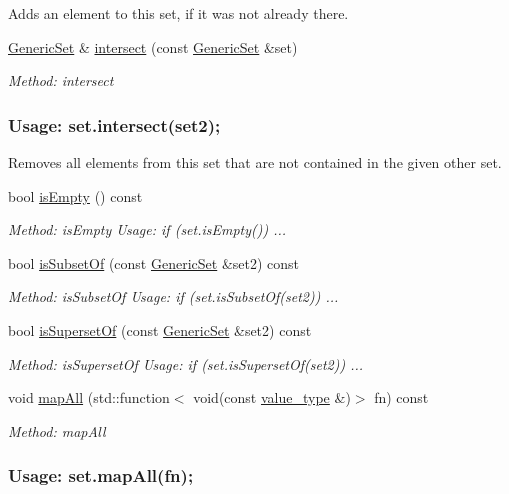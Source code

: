 \begin{DoxyCompactItemize}
\begin{DoxyCompactList}
Adds an element to this set, if it was not already there. \end{DoxyCompactList}\item 
\mbox{\hyperlink{classstanfordcpplib_1_1collections_1_1GenericSet}{Generic\+Set}} \& \mbox{\hyperlink{classstanfordcpplib_1_1collections_1_1GenericSet_a1892695645d8f29cbc6c8587500f2829}{intersect}} (const \mbox{\hyperlink{classstanfordcpplib_1_1collections_1_1GenericSet}{Generic\+Set}} \&set)
\begin{DoxyCompactList}\small\item\em Method\+: intersect \subsubsection*{Usage\+: set.\+intersect(set2); }

Removes all elements from this set that are not contained in the given other set. \end{DoxyCompactList}\item 
bool \mbox{\hyperlink{classstanfordcpplib_1_1collections_1_1GenericSet_acf82f9b2937375c7b1cf3dccb3df3312}{is\+Empty}} () const
\begin{DoxyCompactList}\small\item\em Method\+: is\+Empty Usage\+: if (set.\+is\+Empty()) ... \end{DoxyCompactList}\item 
bool \mbox{\hyperlink{classstanfordcpplib_1_1collections_1_1GenericSet_af8ce41f03d31f89935db1f3f5fdffc2c}{is\+Subset\+Of}} (const \mbox{\hyperlink{classstanfordcpplib_1_1collections_1_1GenericSet}{Generic\+Set}} \&set2) const
\begin{DoxyCompactList}\small\item\em Method\+: is\+Subset\+Of Usage\+: if (set.\+is\+Subset\+Of(set2)) ... \end{DoxyCompactList}\item 
bool \mbox{\hyperlink{classstanfordcpplib_1_1collections_1_1GenericSet_a074ab19fab73dfcff220d4b64aa5be82}{is\+Superset\+Of}} (const \mbox{\hyperlink{classstanfordcpplib_1_1collections_1_1GenericSet}{Generic\+Set}} \&set2) const
\begin{DoxyCompactList}\small\item\em Method\+: is\+Superset\+Of Usage\+: if (set.\+is\+Superset\+Of(set2)) ... \end{DoxyCompactList}\item 
void \mbox{\hyperlink{classstanfordcpplib_1_1collections_1_1GenericSet_af2ca00030776c68af16559092a3856a4}{map\+All}} (std\+::function$<$ void(const \mbox{\hyperlink{classstanfordcpplib_1_1collections_1_1GenericSet_a669c81f158766925e7293f97c0099b28}{value\+\_\+type}} \&)$>$ fn) const
\begin{DoxyCompactList}\small\item\em Method\+: map\+All \subsubsection*{Usage\+: set.\+map\+All(fn); }


\end{DoxyCompactList}
\end{DoxyCompactItemize}
